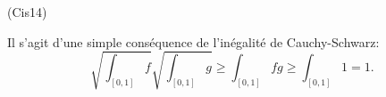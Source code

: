 \begin{tiny}(Cis14)\end{tiny} Il s'agit d'une simple conséquence de l'inégalité de Cauchy-Schwarz:
\[
 \sqrt{\int_{\left[ 0,1\right] }f} \sqrt{\int_{\left[ 0,1\right] }g} \geq \int_{\left[ 0,1\right] }fg \geq \int_{\left[ 0,1\right] }1 = 1 .
\]
